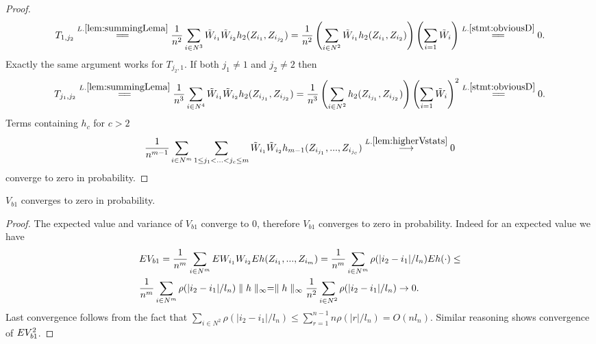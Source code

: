 \begin{proof}
\begin{align}
T_{1,j_2} \overset{L.\ref{lem:summingLema}}{=\joinrel=} \frac{1} {n^2}  \sum_{i \in N^3}  \tilde W_{i_1} \tilde W_{i_2} h_2(Z_{i_1},Z_{i_{j_2}}) = \frac{1} {n^2} \left( \sum_{i \in N^2}  \tilde W_{i_1}  h_2(Z_{i_1},Z_{i_2}) \right) \left( \sum_{i=1} \tilde W_i \right)  \overset{L.\ref{stmt:obviousD}}{=\joinrel=} 0.
\end{align}
Exactly the same argument works for $T_{j_2,1}$. If both $j_1 \neq 1$ and $j_2 \neq 2$ then 
\begin{align}
T_{j_1,j_2} \overset{L.\ref{lem:summingLema}}{=\joinrel=} \frac{1} {n^3}  \sum_{i \in N^4}  \tilde W_{i_1} \tilde W_{i_2} h_2(Z_{i_{j_1}},Z_{i_{j_2}}) = \frac{1} {n^3} \left( \sum_{i \in N^2}   h_2(Z_{i_{j_1}},Z_{i_{j_2}})\right) \left( \sum_{i=1} \tilde W_i \right)^2 \overset{L.\ref{stmt:obviousD}}{=\joinrel=}0.
\end{align}   
Terms containing $h_c$ for $c>2$ 
\begin{align}
\frac{1} {n^{m-1}}  \sum_{i \in N^m} \sum_{1 \leq j_1 < ...<j_{c} \leq m } \tilde W_{i_1} \tilde W_{i_2}  h_{m-1}(Z_{i_{j_1}},...,Z_{i_{j_{c}}}) \overset{L. \ref{lem:higherVstats}}{\longrightarrow} 0 
\end{align}
converge to zero in probability.
 \end{proof}
  
\begin{lemma}
\label{lem:degb2}
$ V_{b1}$ converges to zero in probability.  
\end{lemma}  
\begin{proof}
The expected value and variance of $V_{b1}$ converge to 0, therefore $V_{b1}$ converges to zero in probability. Indeed for an expected value we have
\begin{align}
& E V_{b1} = \frac {1} {n^m} \sum_{i \in N^m} E W_{i_1} W_{i_2} E h(Z_{i_1},...,Z_{i_m}) =  \frac {1} {n^m} \sum_{i \in N^m} \rho(|i_2-i_1|/l_n)  E h(\cdot) \leq   \\
&\frac {1} {n^m} \sum_{i \in N^m}  \rho(|i_2-i_1|/l_n) \parallel h \parallel_{\infty} =  \parallel h \parallel_{\infty} \frac {1} {n^2} \sum_{i \in N^2}  \rho(|i_2-i_1|/l_n)  \to 0.
\end{align}
Last convergence follows from the fact that $\sum_{i \in N^2}  \rho(|i_2-i_1|/l_n) \leq \sum_{r=1}^{n-1} n \rho(|r|/l_n)= O(n l_n)$. Similar reasoning shows convergence of $E V_{b1}^2$.
\end{proof}  
  
